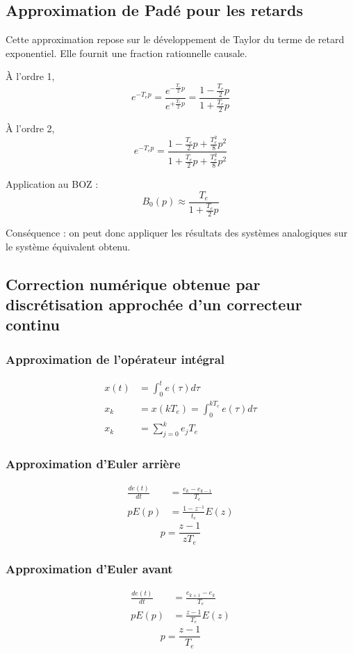 \documentclass[main.tex]{subfiles}
\begin{document}
\subsection{Approximation de Padé pour les retards}

Cette approximation repose sur le développement de Taylor du terme de retard exponentiel. Elle fournit une fraction rationnelle causale.

À l'ordre 1,
\[ e^{-T_ep} = \frac{e^{-\frac{T_e}{2}p}}{e^{+\frac{T_e}{2}p}} = \frac{1 - \frac{T_e}{2}p}{1 + \frac{T_e}{2}p} \]

À l'ordre 2,
\[ e^{-T_ep} = \frac{1 - \frac{T_e}{2}p + \frac{T_e^2}{8}p^2}{1 + \frac{T_e}{2}p + \frac{T_e^2}{8}p^2}  \]

Application au BOZ :
\[\boxed{B_0(p) \approx \frac{T_e}{1+\frac{T_e}{2}p}}\]

Conséquence : on peut donc appliquer les résultats des systèmes analogiques sur le système équivalent obtenu.

\subsection{Correction numérique obtenue par discrétisation approchée d'un correcteur continu}

\subsubsection*{Approximation de l'opérateur intégral}

\begin{align*}
x(t) & = \int_ 0^t e(\tau)d\tau\\
x_k & = x(kT_e) = \int_ 0^{kT_e} e(\tau)d\tau \\
x_k & = \sum_{j=0}^k e_jT_e
\end{align*}


\subsubsection*{Approximation d'Euler arrière}
\begin{align*}
\frac{de(t)}{dt} & = \frac{e_k - e_{k-1}}{T_e} \\
pE(p) & = \frac{1-z^{-1}}{t_e}E(z)
\end{align*}
\[ \boxed{p = \frac{z-1}{zT_e}} \]

\subsubsection*{Approximation d'Euler avant}
\begin{align*}
\frac{de(t)}{dt}& = \frac{e_{k+1}-e_k}{T_e} \\
pE(p) & = \frac{z-1}{T_e}E(z)
\end{align*}
\[ \boxed{p = \frac{z-1}{T_e} } \]
\end{document}
